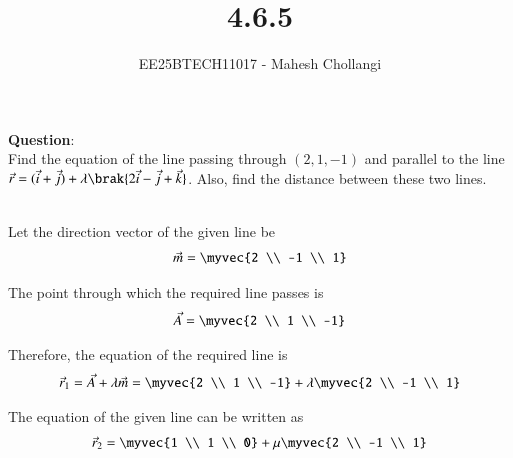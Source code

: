 \documentclass[journal]{IEEEtran}
\begin{document}

\vspace{3cm}

\title{4.6.5}
\author{EE25BTECH11017 - Mahesh Chollangi}
\maketitle
{\let\newpage\relax\maketitle}

\renewcommand{\thefigure}{\theenumi}
\renewcommand{\thetable}{\theenumi}
\setlength{\intextsep}{10pt} %


\renewcommand{\thetable}{\theenumi}

\textbf{Question}:\\
Find the equation of the line passing through $(2,1,-1)$ and parallel to the line $\vec{r} = (\vec{i} + \vec{j}) + \lambda\brak{2\vec{i} - \vec{j} + \vec{k}}$. Also, find the distance between these two lines.

\solution \\

Let the direction vector of the given line be
\begin{align}
\vec{m} = \myvec{2 \\ -1 \\ 1}
\end{align}

The point through which the required line passes is
\begin{align}
\vec{A} = \myvec{2 \\ 1 \\ -1}
\end{align}

Therefore, the equation of the required line is
\begin{align}
\vec{r}_1 = \vec{A} + \lambda \vec{m} = \myvec{2 \\ 1 \\ -1} + \lambda \myvec{2 \\ -1 \\ 1}
\end{align}

The equation of the given line can be written as
\begin{align}
\vec{r}_2 = \myvec{1 \\ 1 \\ 0} + \mu \myvec{2 \\ -1 \\ 1}
\end{align}
\end{document}
